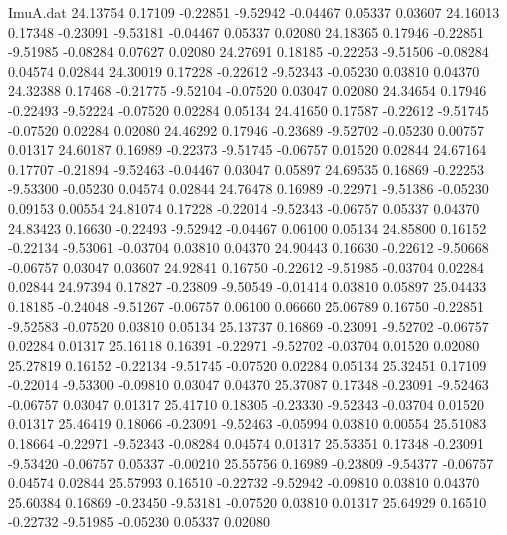 \begin{filecontents}{ImuA.dat}
  24.13754    0.17109   -0.22851   -9.52942   -0.04467    0.05337    0.03607
  24.16013    0.17348   -0.23091   -9.53181   -0.04467    0.05337    0.02080
  24.18365    0.17946   -0.22851   -9.51985   -0.08284    0.07627    0.02080
  24.27691    0.18185   -0.22253   -9.51506   -0.08284    0.04574    0.02844
  24.30019    0.17228   -0.22612   -9.52343   -0.05230    0.03810    0.04370
  24.32388    0.17468   -0.21775   -9.52104   -0.07520    0.03047    0.02080
  24.34654    0.17946   -0.22493   -9.52224   -0.07520    0.02284    0.05134
  24.41650    0.17587   -0.22612   -9.51745   -0.07520    0.02284    0.02080
  24.46292    0.17946   -0.23689   -9.52702   -0.05230    0.00757    0.01317
  24.60187    0.16989   -0.22373   -9.51745   -0.06757    0.01520    0.02844
  24.67164    0.17707   -0.21894   -9.52463   -0.04467    0.03047    0.05897
  24.69535    0.16869   -0.22253   -9.53300   -0.05230    0.04574    0.02844
  24.76478    0.16989   -0.22971   -9.51386   -0.05230    0.09153    0.00554
  24.81074    0.17228   -0.22014   -9.52343   -0.06757    0.05337    0.04370
  24.83423    0.16630   -0.22493   -9.52942   -0.04467    0.06100    0.05134
  24.85800    0.16152   -0.22134   -9.53061   -0.03704    0.03810    0.04370
  24.90443    0.16630   -0.22612   -9.50668   -0.06757    0.03047    0.03607
  24.92841    0.16750   -0.22612   -9.51985   -0.03704    0.02284    0.02844
  24.97394    0.17827   -0.23809   -9.50549   -0.01414    0.03810    0.05897
  25.04433    0.18185   -0.24048   -9.51267   -0.06757    0.06100    0.06660
  25.06789    0.16750   -0.22851   -9.52583   -0.07520    0.03810    0.05134
  25.13737    0.16869   -0.23091   -9.52702   -0.06757    0.02284    0.01317
  25.16118    0.16391   -0.22971   -9.52702   -0.03704    0.01520    0.02080
  25.27819    0.16152   -0.22134   -9.51745   -0.07520    0.02284    0.05134
  25.32451    0.17109   -0.22014   -9.53300   -0.09810    0.03047    0.04370
  25.37087    0.17348   -0.23091   -9.52463   -0.06757    0.03047    0.01317
  25.41710    0.18305   -0.23330   -9.52343   -0.03704    0.01520    0.01317
  25.46419    0.18066   -0.23091   -9.52463   -0.05994    0.03810    0.00554
  25.51083    0.18664   -0.22971   -9.52343   -0.08284    0.04574    0.01317
  25.53351    0.17348   -0.23091   -9.53420   -0.06757    0.05337   -0.00210
  25.55756    0.16989   -0.23809   -9.54377   -0.06757    0.04574    0.02844
  25.57993    0.16510   -0.22732   -9.52942   -0.09810    0.03810    0.04370
  25.60384    0.16869   -0.23450   -9.53181   -0.07520    0.03810    0.01317
  25.64929    0.16510   -0.22732   -9.51985   -0.05230    0.05337    0.02080

\end{filecontents}
